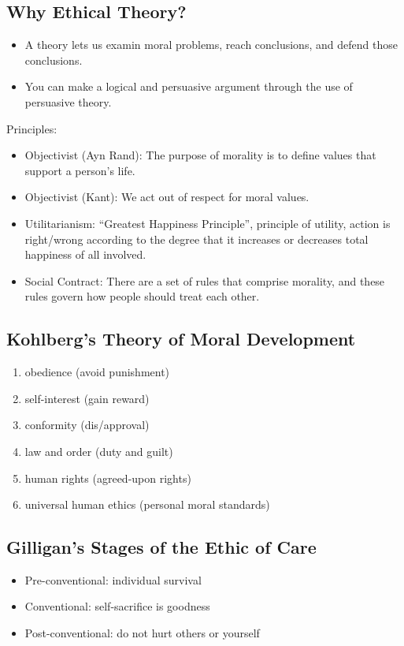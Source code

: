 \documentclass{article}
\begin{document}
\subsection*{Why Ethical Theory?}
\begin{itemize}
  \item A theory lets us examin moral problems, reach conclusions, and defend
    those conclusions.
  \item You can make a logical and persuasive argument through the use of
    persuasive theory.
\end{itemize}
Principles:
\begin{itemize}
  \item Objectivist (Ayn Rand): The purpose of morality is to define values
    that support a person's life.
  \item Objectivist (Kant): We act out of respect for moral values.
  \item Utilitarianism: ``Greatest Happiness Principle'', principle of utility,
    action is right/wrong according to the degree that it increases or
    decreases total happiness of all involved.
  \item Social Contract: There are a set of rules that comprise morality, and
    these rules govern how people should treat each other.
\end{itemize}

\subsection*{Kohlberg's Theory of Moral Development}
\begin{enumerate}
  \item obedience (avoid punishment)
  \item self-interest (gain reward)
  \item conformity (dis/approval)
  \item law and order (duty and guilt)
  \item human rights (agreed-upon rights)
  \item universal human ethics (personal moral standards)
\end{enumerate}

\subsection*{Gilligan's Stages of the Ethic of Care}
\begin{itemize}
  \item Pre-conventional: individual survival
  \item Conventional: self-sacrifice is goodness
  \item Post-conventional: do not hurt others or yourself
\end{itemize}
\end{document}
